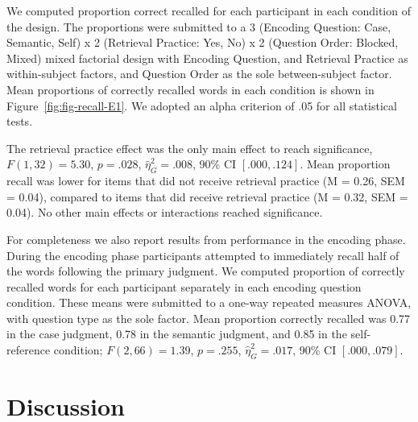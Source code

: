 \documentclass[
  man,floatsintext]{apa6}
\begin{document}
We computed proportion correct recalled for each participant in each condition of the design. The proportions were submitted to a 3 (Encoding Question: Case, Semantic, Self) x 2 (Retrieval Practice: Yes, No) x 2 (Question Order: Blocked, Mixed) mixed factorial design with Encoding Question, and Retrieval Practice as within-subject factors, and Question Order as the sole between-subject factor. Mean proportions of correctly recalled words in each condition is shown in Figure~\ref{fig:fig-recall-E1}. We adopted an alpha criterion of .05 for all statistical tests.

The retrieval practice effect was the only main effect to reach significance, \(F(1, 32) = 5.30\), \(p = .028\), \(\hat{\eta}^2_G = .008\), 90\% CI \([.000, .124]\). Mean proportion recall was lower for items that did not receive retrieval practice (M = 0.26, SEM = 0.04), compared to items that did receive retrieval practice (M = 0.32, SEM = 0.04). No other main effects or interactions reached significance.

For completeness we also report results from performance in the encoding phase. During the encoding phase participants attempted to immediately recall half of the words following the primary judgment. We computed proportion of correctly recalled words for each participant separately in each encoding question condition. These means were submitted to a one-way repeated measures ANOVA, with question type as the sole factor. Mean proportion correctly recalled was 0.77 in the case judgment, 0.78 in the semantic judgment, and 0.85 in the self-reference condition; \(F(2, 66) = 1.39\), \(p = .255\), \(\hat{\eta}^2_G = .017\), 90\% CI \([.000, .079]\).

\hypertarget{discussion}{%
\section{Discussion}\label{discussion}}
\end{document}
